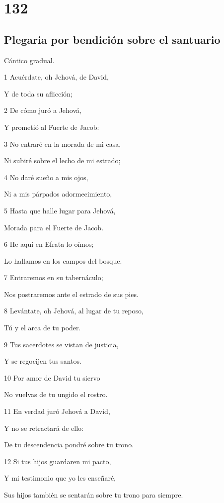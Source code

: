 \chapter{132}

\section*{Plegaria por bendición sobre el santuario}

\par Cántico gradual.

\par 1 Acuérdate, oh Jehová, de David,
\par Y de toda su aflicción;
\par 2 De cómo juró a Jehová,
\par Y prometió al Fuerte de Jacob:
\par 3 No entraré en la morada de mi casa,
\par Ni subiré sobre el lecho de mi estrado;
\par 4 No daré sueño a mis ojos,
\par Ni a mis párpados adormecimiento,
\par 5 Hasta que halle lugar para Jehová,
\par Morada para el Fuerte de Jacob.
\par 6 He aquí en Efrata lo oímos;
\par Lo hallamos en los campos del bosque.
\par 7 Entraremos en su tabernáculo;
\par Nos postraremos ante el estrado de sus pies.
\par 8 Levántate, oh Jehová, al lugar de tu reposo,
\par Tú y el arca de tu poder.
\par 9 Tus sacerdotes se vistan de justicia,
\par Y se regocijen tus santos.
\par 10 Por amor de David tu siervo
\par No vuelvas de tu ungido el rostro.
\par 11 En verdad juró Jehová a David,
\par Y no se retractará de ello:
\par De tu descendencia pondré sobre tu trono.
\par 12 Si tus hijos guardaren mi pacto,
\par Y mi testimonio que yo les enseñaré,
\par Sus hijos también se sentarán sobre tu trono para siempre.
